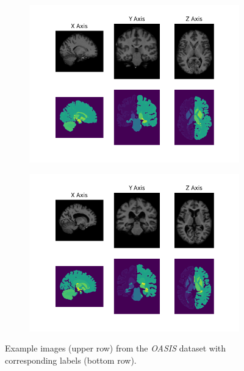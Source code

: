 \documentclass[english,version-2022-01]{uzl-thesis} %
\begin{document}
\begin{figure}[h]%
	\centering
	\graphicspath{{images/}{\main/images/}}
	\begin{subfigure}{0.45\textwidth}
    		\includegraphics[width=\textwidth]{image2.png}
		\caption{}    		
    		\label{fig:image2}
	\end{subfigure}
	\hfill
	\begin{subfigure}{0.45\textwidth}
    		\includegraphics[width=\textwidth]{image1.png}
		\caption{}    		
    		\label{fig:image1}
	\end{subfigure}
	\caption{Example images (upper row) from the \emph{OASIS} dataset with corresponding labels (bottom row).}
	\label{fig:OASIS}
\end{figure}
\end{document}
